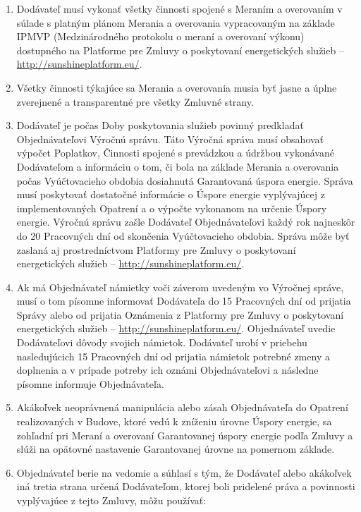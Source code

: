 \begin{multicols}{2}
\begin{enumerate}
\def\labelenumi{\arabic{enumi}.}
\item
  Dodávateľ musí vykonať všetky činnosti spojené s Meraním a overovaním
  v súlade s platným plánom Merania a overovania vypracovaným na základe
  IPMVP (Medzinárodného protokolu o meraní a overovaní výkonu)
  dostupného na Platforme pre Zmluvy o poskytovaní energetických služieb
  -- \href{http://www.sharex.lv}{http://sunshineplatform.eu/}.
\item
  Všetky činnosti týkajúce sa Merania a overovania musia byť jasne a
  úplne zverejnené a transparentné pre všetky Zmluvné strany.
\item
  Dodávateľ je počas Doby poskytovania služieb povinný predkladať
  Objednávateľovi Výročnú správu. Táto Výročná správa musí obsahovať
  výpočet Poplatkov, Činnosti spojené s prevádzkou a údržbou vykonávané
  Dodávateľom a informáciu o tom, či bola na základe Merania a
  overovania počas Vyúčtovacieho obdobia dosiahnutá Garantovaná úspora
  energie. Správa musí poskytovať dostatočné informácie o Úspore energie
  vyplývajúcej z implementovaných Opatrení a o výpočte vykonanom na
  určenie Úspory energie. Výročnú správu zašle Dodávateľ Objednávateľovi
  každý rok najneskôr do 20 Pracovných dní od skončenia Vyúčtovacieho
  obdobia. Správa môže byť zaslaná aj prostredníctvom Platformy pre
  Zmluvy o poskytovaní energetických služieb --
  \href{http://www.sharex.lv}{http://sunshineplatform.eu/}.
\item
  Ak má Objednávateľ námietky voči záverom uvedeným vo Výročnej správe,
  musí o tom písomne informovať Dodávateľa do 15 Pracovných dní od
  prijatia Správy alebo od prijatia Oznámenia z Platformy pre Zmluvy o
  poskytovaní energetických služieb --
  \href{http://www.sharex.lv}{http://sunshineplatform.eu/}. Objednávateľ
  uvedie Dodávateľovi dôvody svojich námietok. Dodávateľ urobí v
  priebehu nasledujúcich 15 Pracovných dní od prijatia námietok potrebné
  zmeny a doplnenia a v prípade potreby ich oznámi Objednávateľovi a
  následne písomne informuje Objednávateľa.
\item
  Akákoľvek neoprávnená manipulácia alebo zásah Objednávateľa do
  Opatrení realizovaných v Budove, ktoré vedú k zníženiu úrovne Úspory
  energie, sa zohľadní pri Meraní a overovaní Garantovanej úspory
  energie podľa Zmluvy a slúži na opätovné nastavenie Garantovanej
  úrovne na pomernom základe.
\item
  Objednávateľ berie na vedomie a súhlasí s tým, že Dodávateľ alebo
  akákoľvek iná tretia strana určená Dodávateľom, ktorej boli pridelené
  práva a povinnosti vyplývajúce z tejto Zmluvy, môžu používať:


\end{enumerate}
\end{multicols}
